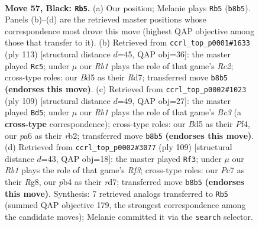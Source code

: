\documentclass[11pt]{article}
\begin{document}
\clearpage

\begin{figure}[p]\centering
\begin{subfigure}{0.46\textwidth}\centering
\resizebox{\linewidth}{!}{%
\newchessgame
\chessboard[
  setfen={1rk5/p1p3r1/P1p3p1/2Pb1p1p/RP3P1P/6R1/5K2/1N6 b - - 37 57},
  showmover=false,
  pgfstyle=straightmove, color=movearrow, markmove={b8-b5}
]}
\caption{}
\end{subfigure}\hfill
\begin{subfigure}{0.46\textwidth}\centering
\resizebox{\linewidth}{!}{%
\newchessgame
\chessboard[
  setfen={8/kprr4/p5p1/P4p2/1RP2PpP/4R1P1/4K3/8 b - - 13 57},
  showmover=false,
  pgfstyle=straightmove, color=movearrow, markmove={c7-c5}
]}
\caption{}
\end{subfigure}
\\[4pt]
\begin{subfigure}{0.46\textwidth}\centering
\resizebox{\linewidth}{!}{%
\newchessgame
\chessboard[
  setfen={8/2kp4/2b1p2p/r1P3pP/p4pP1/P4P2/1R3K2/2R5 b - - 16 55},
  showmover=false,
  pgfstyle=straightmove, color=movearrow, markmove={c6-d5}
]}
\caption{}
\end{subfigure}\hfill
\begin{subfigure}{0.46\textwidth}\centering
\resizebox{\linewidth}{!}{%
\newchessgame
\chessboard[
  setfen={6r1/1R1R4/p4rk1/1p2p1p1/1Pp1P1Pp/2P4P/3K4/8 b - - 10 55},
  showmover=false,
  pgfstyle=straightmove, color=movearrow, markmove={f6-f3}
]}
\caption{}
\end{subfigure}
\caption{\textbf{Move 57, Black: \texttt{Rb5}.} (a) Our position; Melanie plays \texttt{Rb5} (\texttt{b8b5}). Panels (b)--(d) are the retrieved master positions whose correspondence most drove this move (highest QAP objective among those that transfer to it). (b) Retrieved from \texttt{ccrl\_top\_p0001\#1633} (ply 113) [structural distance $d$=45, QAP obj=36]: the master played \texttt{Rc5}; under $\mu$ our \emph{Rb1} plays the role of that game's \emph{Rc2}; cross-type roles: our \emph{B}d5 as their \emph{R}d7; transferred move \texttt{b8b5} \textbf{(endorses this move)}. (c) Retrieved from \texttt{ccrl\_top\_p0002\#1023} (ply 109) [structural distance $d$=49, QAP obj=27]: the master played \texttt{Bd5}; under $\mu$ our \emph{Rb1} plays the role of that game's \emph{Bc3} (a \textbf{cross-type} correspondence); cross-type roles: our \emph{B}d5 as their \emph{P}f4, our \emph{p}a6 as their \emph{r}b2; transferred move \texttt{b8b5} \textbf{(endorses this move)}. (d) Retrieved from \texttt{ccrl\_top\_p0002\#3077} (ply 109) [structural distance $d$=43, QAP obj=18]: the master played \texttt{Rf3}; under $\mu$ our \emph{Rb1} plays the role of that game's \emph{Rf3}; cross-type roles: our \emph{P}c7 as their \emph{R}g8, our \emph{p}b4 as their \emph{r}d7; transferred move \texttt{b8b5} \textbf{(endorses this move)}. Synthesis: 7 retrieved analogs transferred to \texttt{Rb5} (summed QAP objective 179, the strongest correspondence among the candidate moves); Melanie committed it via the \texttt{search} selector.}
\label{fig:thought-m113}
\end{figure}
\end{document}
